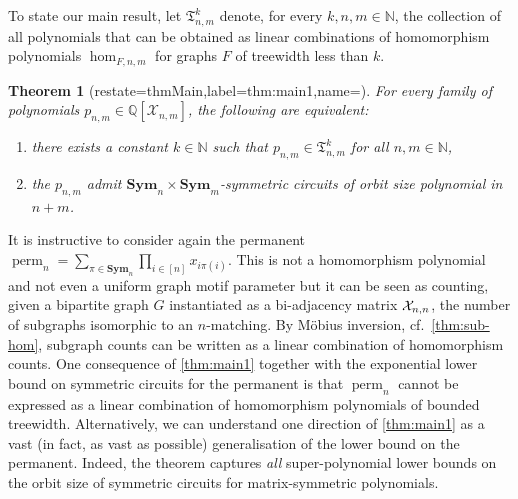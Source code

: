 \documentclass[11pt, DIV=15]{scrarticle}
\theoremstyle{definition}
\theoremstyle{plain}
\newtheorem{theorem}[definition]{Theorem}
\theoremstyle{remark}
\newcommand{\Xx}{{\cal X}}
\DeclareMathOperator{\perm}{perm}
\newcommand{\Sym}{\mathbf{Sym}}
\newcommand{\bbN}{\mathbb{N}}
\begin{document}
To state our main result, let $\mathfrak{T}_{n,m}^k$ denote, for every $k,n,m \in \bbN$, the collection of all polynomials that can be obtained as linear combinations of homomorphism polynomials $\hom_{F,n,m}$ for graphs $F$ of treewidth less than $k$.
\begin{theorem}[restate=thmMain,label=thm:main1,name=]
	For every family of polynomials $p_{n,m} \in \mathbb{Q}[\mathcal{X}_{n,m}]$, the following are equivalent:
	\begin{enumerate}
		\item there exists a constant $k \in \mathbb{N}$ such that $p_{n,m} \in \mathfrak{T}_{n,m}^k$ for all $n,m \in \mathbb{N}$,\label{it:main1}
		\item the $p_{n,m}$ admit $\Sym_n \times \Sym_m$-symmetric circuits of orbit size polynomial in $n+m$.\label{it:main2}
	\end{enumerate}
\end{theorem}

It is instructive to consider again the permanent $\perm_n = \sum_{\pi \in \Sym_n} \prod_{i \in [n]} x_{i\pi(i)}$. 
This is not a homomorphism polynomial
and not even a uniform graph motif parameter
 but it can be seen as counting, given a bipartite graph $G$ instantiated as a bi-adjacency matrix $\Xx_{n,n}$, the number of subgraphs isomorphic to an $n$-matching. 
By M\"obius inversion, cf.\ \cref{thm:sub-hom}, subgraph counts can be written as a linear combination of homomorphism counts.
One consequence of \cref{thm:main1} together with the exponential lower bound on symmetric circuits for the permanent \cite{dawar_symmetric_2025} is that $\perm_n$ cannot be expressed as a linear combination of homomorphism polynomials of bounded treewidth.  
Alternatively, we can understand one direction of \cref{thm:main1} as a vast (in fact, as vast as possible) generalisation of the lower bound on the permanent. 
Indeed, the theorem captures \emph{all} super-polynomial lower bounds on the orbit size of symmetric circuits for matrix-symmetric polynomials.
\end{document}
